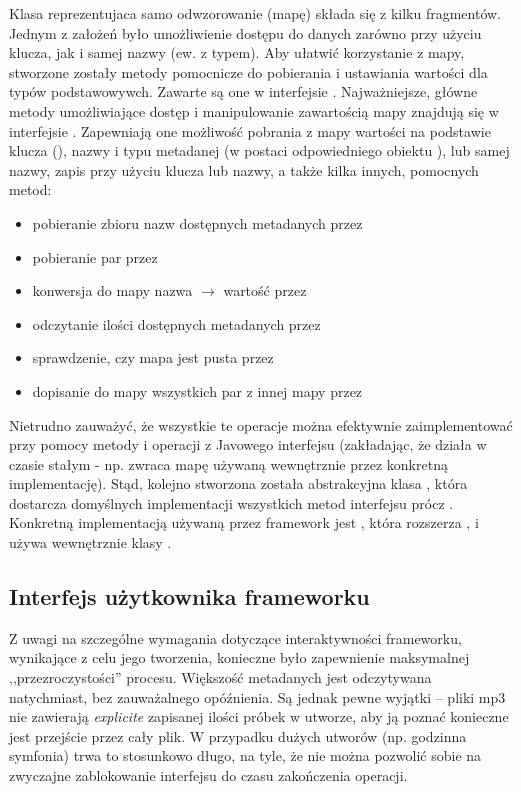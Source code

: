 Klasa reprezentujaca samo odwzorowanie (mapę) składa się z kilku fragmentów. Jednym z założeń było
umożliwienie dostępu do danych zarówno przy użyciu klucza, jak i samej nazwy (ew. z typem). Aby
ułatwić korzystanie z mapy, stworzone zostały metody pomocnicze do pobierania i ustawiania wartości
dla typów podstawowywch. Zawarte są one w interfejsie . Najważniejsze, główne
metody umożliwiające dostęp i manipulowanie zawartością mapy znajdują się w interfejsie
. Zapewniają one możliwość pobrania z mapy wartości na podstawie klucza
(), nazwy i typu metadanej (w postaci odpowiedniego obiektu ), lub samej
nazwy, zapis przy użyciu klucza lub nazwy, a także kilka innych, pomocnych metod:

\begin{itemize}
  \item pobieranie zbioru nazw dostępnych metadanych przez 
  \item pobieranie par  przez  
  \item konwersja do mapy nazwa $\to$ wartość przez 
  \item odczytanie ilości dostępnych metadanych przez 
  \item sprawdzenie, czy mapa jest pusta przez 
  \item dopisanie do mapy wszystkich par z innej mapy przez 
\end{itemize}

Nietrudno zauważyć, że wszystkie te operacje można efektywnie zaimplementować przy pomocy metody
 i operacji z Javowego interfejsu  (zakładając, że  działa w
czasie stałym - np. zwraca mapę używaną wewnętrznie przez konkretną implementację). Stąd, kolejno
stworzona została abstrakcyjna klasa , która dostarcza domyślnych
implementacji wszystkich metod interfejsu  prócz . Konkretną
implementacją używaną przez framework jest , która rozszerza
, i używa wewnętrznie klasy .


\subsection{Interfejs użytkownika frameworku}

Z uwagi na szczególne wymagania dotyczące interaktywności frameworku, wynikające z celu jego
tworzenia, konieczne było zapewnienie maksymalnej ,,przezroczystości'' procesu.  Większość
metadanych jest odczytywana natychmiast, bez zauważalnego opóźnienia. Są jednak pewne wyjątki --
pliki mp3 nie zawierają \textit{explicite} zapisanej ilości próbek w utworze, aby ją poznać
konieczne jest przejście przez cały plik. W przypadku dużych utworów (np. godzinna symfonia) trwa to
stosunkowo długo, na tyle, że nie można pozwolić sobie na zwyczajne zablokowanie interfejsu do czasu
zakończenia operacji.

